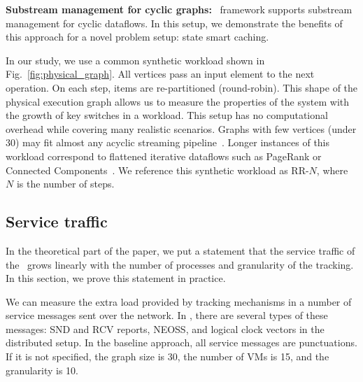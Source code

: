     \noindent \textbf{Substream management for cyclic graphs:} \tracker\ framework supports substream management for cyclic dataflows. In this setup, we demonstrate the benefits of this approach for a novel problem setup: state smart caching.


In our study, we use a common synthetic workload shown in Fig.~\ref{fig:physical_graph}. All vertices pass an input element to the next operation. On each step, items are re-partitioned (round-robin). This shape of the physical execution graph allows us to measure the properties of the system with the growth of key switches in a workload. This setup has no computational overhead while covering many realistic scenarios. Graphs with few vertices (under 30) may fit almost any acyclic streaming pipeline~\cite{akidau2018streaming}. Longer instances of this workload correspond to flattened iterative dataflows such as PageRank or Connected Components~\cite{Murray:2013:NTD:2517349.2522738, xu2016efficient}. We reference this synthetic workload as RR-$N$, where $N$ is the number of steps.

\subsection{Service traffic}
\label{exp_network_traffic}
In the theoretical part of the paper, we put a statement that the service traffic of the \tracker\ grows linearly with the number of processes and granularity of the tracking. In this section, we prove this statement in practice. 

We can measure the extra load provided by tracking mechanisms in a number of service messages sent over the network. In \tracker, there are several types of these messages: SND and RCV reports, NEOSS, and logical clock vectors in the distributed setup. In the baseline approach, all service messages are punctuations. If it is not specified, the graph size is 30, the number of VMs is 15, and the granularity is 10.

